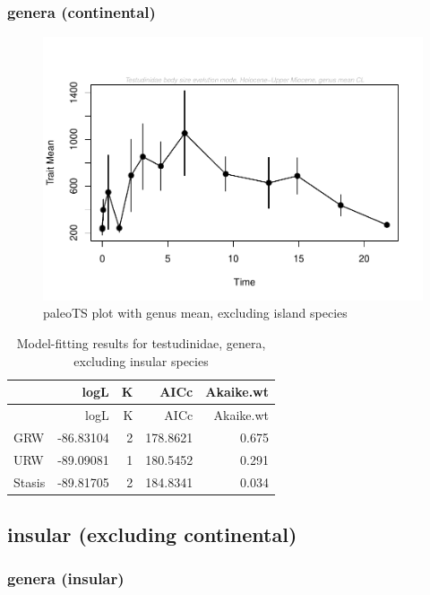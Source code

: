 \documentclass[]{article}
\begin{document}
\subsubsection{genera (continental)}\label{genera-continental}

\begin{figure}[htbp]
\centering
\includegraphics{MA_JJ_files/figure-latex/paleoTS plot with genus mean, excluding island species-1.pdf}
\caption{paleoTS plot with genus mean, excluding island species}
\end{figure}

\begin{longtable}[]{@{}lrrrr@{}}
\caption{Model-fitting results for testudinidae, genera, excluding
insular species}\tabularnewline
\toprule
& logL & K & AICc & Akaike.wt\tabularnewline
\midrule
\endfirsthead
\toprule
& logL & K & AICc & Akaike.wt\tabularnewline
\midrule
\endhead
GRW & -86.83104 & 2 & 178.8621 & 0.675\tabularnewline
URW & -89.09081 & 1 & 180.5452 & 0.291\tabularnewline
Stasis & -89.81705 & 2 & 184.8341 & 0.034\tabularnewline
\bottomrule
\end{longtable}

\newpage

\subsection{insular (excluding
continental)}\label{insular-excluding-continental}

\subsubsection{genera (insular)}\label{genera-insular}
\end{document}
